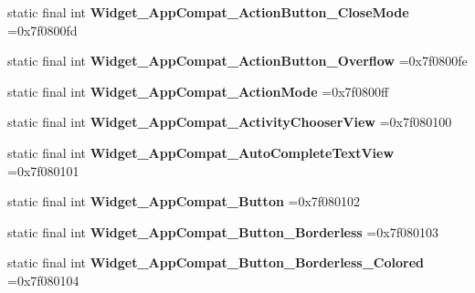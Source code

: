 \begin{DoxyCompactItemize}
\item 
\hypertarget{classcheck_1_1test_1_1_r_1_1style_a2b01880de215f75251d765c93e7580f2}{}static final int {\bfseries Widget\+\_\+\+App\+Compat\+\_\+\+Action\+Button\+\_\+\+Close\+Mode} =0x7f0800fd\label{classcheck_1_1test_1_1_r_1_1style_a2b01880de215f75251d765c93e7580f2}

\item 
\hypertarget{classcheck_1_1test_1_1_r_1_1style_a2c0d2c1e60813b127a5a7a32b5b1844d}{}static final int {\bfseries Widget\+\_\+\+App\+Compat\+\_\+\+Action\+Button\+\_\+\+Overflow} =0x7f0800fe\label{classcheck_1_1test_1_1_r_1_1style_a2c0d2c1e60813b127a5a7a32b5b1844d}

\item 
\hypertarget{classcheck_1_1test_1_1_r_1_1style_a2b9d0b6479541221b50bb37e20a0a0e9}{}static final int {\bfseries Widget\+\_\+\+App\+Compat\+\_\+\+Action\+Mode} =0x7f0800ff\label{classcheck_1_1test_1_1_r_1_1style_a2b9d0b6479541221b50bb37e20a0a0e9}

\item 
\hypertarget{classcheck_1_1test_1_1_r_1_1style_a4e5b3544ac7e0f24f84e51c42fed2f38}{}static final int {\bfseries Widget\+\_\+\+App\+Compat\+\_\+\+Activity\+Chooser\+View} =0x7f080100\label{classcheck_1_1test_1_1_r_1_1style_a4e5b3544ac7e0f24f84e51c42fed2f38}

\item 
\hypertarget{classcheck_1_1test_1_1_r_1_1style_ab7438a2cecd3ee5750734cca2e39588a}{}static final int {\bfseries Widget\+\_\+\+App\+Compat\+\_\+\+Auto\+Complete\+Text\+View} =0x7f080101\label{classcheck_1_1test_1_1_r_1_1style_ab7438a2cecd3ee5750734cca2e39588a}

\item 
\hypertarget{classcheck_1_1test_1_1_r_1_1style_ad291f8f2dd438a62f657d42047e06259}{}static final int {\bfseries Widget\+\_\+\+App\+Compat\+\_\+\+Button} =0x7f080102\label{classcheck_1_1test_1_1_r_1_1style_ad291f8f2dd438a62f657d42047e06259}

\item 
\hypertarget{classcheck_1_1test_1_1_r_1_1style_adfdd9e6784b2c9db149a9c4b20e8f9e9}{}static final int {\bfseries Widget\+\_\+\+App\+Compat\+\_\+\+Button\+\_\+\+Borderless} =0x7f080103\label{classcheck_1_1test_1_1_r_1_1style_adfdd9e6784b2c9db149a9c4b20e8f9e9}

\item 
\hypertarget{classcheck_1_1test_1_1_r_1_1style_aecf010ca64bf8da4db5f7b98eebad0f4}{}static final int {\bfseries Widget\+\_\+\+App\+Compat\+\_\+\+Button\+\_\+\+Borderless\+\_\+\+Colored} =0x7f080104\label{classcheck_1_1test_1_1_r_1_1style_aecf010ca64bf8da4db5f7b98eebad0f4}


\end{DoxyCompactItemize}
